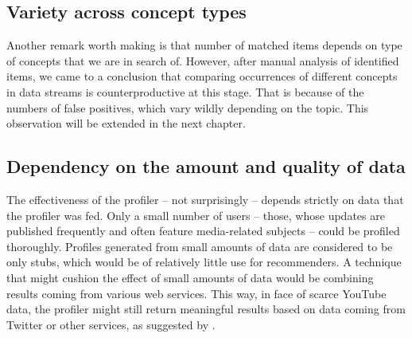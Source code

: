 \subsection{Variety across concept types}
Another remark worth making is that number of matched items depends on type of
concepts that we are in search of. However, after manual analysis of identified
items, we came to a conclusion that comparing occurrences of
different concepts in data streams is counterproductive at this stage.
That is because of the numbers of false positives, which vary wildly
depending on the topic. This observation will be extended in the next chapter.

\subsection{Dependency on the amount and quality of data}

The effectiveness of the profiler -- not surprisingly -- depends strictly on data
that the profiler was fed. Only a small number of users -- those, whose updates
are published frequently and often feature media-related subjects -- could be
profiled thoroughly. Profiles generated from small amounts of data are considered
to be only stubs, which would be of relatively little use for recommenders. A technique that
might cushion the effect of small amounts of data would be combining results
coming from various web services. This way, in face of scarce YouTube data, the
profiler might still return meaningful results based on data coming from
Twitter or other services, as suggested by \cite{public-profiles}.
